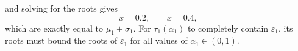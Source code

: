 \begin{example}
\begin{equation}
\end{equation}
and solving for the roots gives
\begin{equation}
    x = 0.2, \qquad x = 0.4,
\end{equation}
which are exactly equal to $\mu_1\pm\sigma_1$. For $\tau_1(\alpha_1)$ to completely contain $\varepsilon_1$, its roots
must bound the roots of $\varepsilon_1$ for all values of $\alpha_1\in(0,1)$.
\begin{figure}[tbp]
    \centering

\end{figure}
\end{example}
